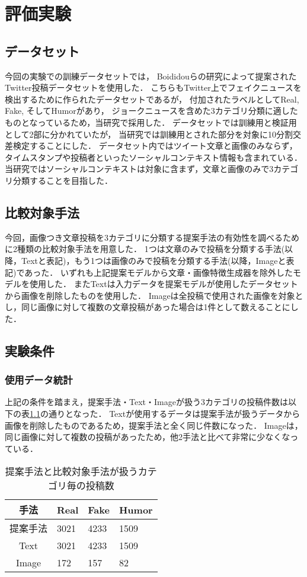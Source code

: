 %
\chapter{評価実験}
%
\section{データセット}
今回の実験での訓練データセットでは，
Boididouらの研究\cite{boididou2015verifying}によって提案されたTwitter投稿データセットを使用した．
こちらもTwitter上でフェイクニュースを検出するために作られたデータセットであるが，
付加されたラベルとしてReal, Fake, そしてHumorがあり，
ジョークニュースを含めた3カテゴリ分類に適したものとなっているため，当研究で採用した．
データセットでは訓練用と検証用として2部に分かれていたが，
当研究では訓練用とされた部分を対象に10分割交差検定することにした．
データセット内ではツイート文章と画像のみならず，
タイムスタンプや投稿者といったソーシャルコンテキスト情報も含まれている．
当研究ではソーシャルコンテキストは対象に含まず，文章と画像のみで3カテゴリ分類することを目指した．
% 
\section{比較対象手法}
今回，画像つき文章投稿を3カテゴリに分類する提案手法の有効性を調べるために2種類の比較対象手法を用意した．
1つは文章のみで投稿を分類する手法(以降，Textと表記)，もう1つは画像のみで投稿を分類する手法(以降，Imageと表記)であった．
いずれも上記提案モデルから文章・画像特徴生成器を除外したモデルを使用した．
またTextは入力データを提案モデルが使用したデータセットから画像を削除したものを使用した．
Imageは全投稿で使用された画像を対象とし，同じ画像に対して複数の文章投稿があった場合は1件として数えることにした．
% 
\section{実験条件}
\subsection{使用データ統計}
上記の条件を踏まえ，提案手法・Text・Imageが扱う3カテゴリの投稿件数は以下の表\ref{table:posts}の通りとなった．
Textが使用するデータは提案手法が扱うデータから画像を削除したものであるため，提案手法と全く同じ件数になった．
Imageは，同じ画像に対して複数の投稿があったため，他2手法と比べて非常に少なくなっている．

\begin{table}[h]
    \caption{提案手法と比較対象手法が扱うカテゴリ毎の投稿数}
    \label{table:posts}
    \centering
    \begin{tabular}{clll}
        \hline
        手法 & Real & Fake & Humor \\
        \hline \hline
        提案手法 & 3021 & 4233 & 1509 \\
        Text & 3021 & 4233 & 1509 \\
        Image & 172 & 157 & 82 \\
        \hline
    \end{tabular}
\end{table}

